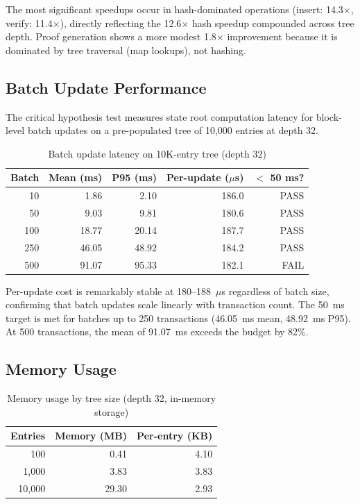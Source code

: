 The most significant speedups occur in hash-dominated operations
(insert: 14.3$\times$, verify: 11.4$\times$), directly reflecting
the 12.6$\times$ hash speedup compounded across tree depth. Proof
generation shows a more modest 1.8$\times$ improvement because it
is dominated by tree traversal (map lookups), not hashing.

\subsection{Batch Update Performance}

The critical hypothesis test measures state root computation latency
for block-level batch updates on a pre-populated tree of 10,000
entries at depth 32.

\begin{table}[h]
\centering
\caption{Batch update latency on 10K-entry tree (depth 32)}
\label{tab:batch}
\begin{tabular}{rrrrr}
\toprule
\textbf{Batch} & \textbf{Mean (ms)} & \textbf{P95 (ms)} & \textbf{Per-update ($\mu$s)} & \textbf{$<$ 50 ms?} \\
\midrule
10  & 1.86  & 2.10  & 186.0 & PASS \\
50  & 9.03  & 9.81  & 180.6 & PASS \\
100 & 18.77 & 20.14 & 187.7 & PASS \\
250 & 46.05 & 48.92 & 184.2 & PASS \\
500 & 91.07 & 95.33 & 182.1 & FAIL \\
\bottomrule
\end{tabular}
\end{table}

Per-update cost is remarkably stable at 180--188~$\mu$s regardless
of batch size, confirming that batch updates scale linearly with
transaction count. The 50~ms target is met for batches up to 250
transactions (46.05~ms mean, 48.92~ms P95). At 500 transactions,
the mean of 91.07~ms exceeds the budget by 82\%.

\subsection{Memory Usage}

\begin{table}[h]
\centering
\caption{Memory usage by tree size (depth 32, in-memory storage)}
\label{tab:memory}
\begin{tabular}{rrr}
\toprule
\textbf{Entries} & \textbf{Memory (MB)} & \textbf{Per-entry (KB)} \\
\midrule
100    & 0.41  & 4.10 \\
1,000  & 3.83  & 3.83 \\
10,000 & 29.30 & 2.93 \\
\bottomrule
\end{tabular}
\end{table}

